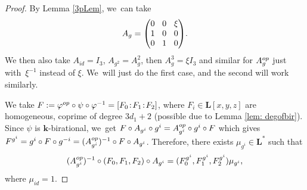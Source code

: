 \documentclass[10pt,a4paper]{amsart}
\newcommand{\op}{\textup{op}}
\newcommand{\sep}{\mkern2mu{:}\mkern2mu}
\theoremstyle{definition}
\newcommand{\kk}{{\boldsymbol{k}}}
\newcommand{\LL}{{\boldsymbol{L}}}
\begin{document}
\begin{proof}
By Lemma \ref{3pLem}, we~can take
\[\arraycolsep4.5pt
A_g =
\begin{pmatrix}
0 & 0 & \xi \\
1 & 0 & 0 \\
0 & 1 & 0
\end{pmatrix}\!.
\]
We then also take $A_{id} = I_3$, $A_{g^2} = A_g^2$, then $A_g^3 = \xi I_3$ and similar for $A_g^{\op}$ just with~$\xi^{-1}$ instead of $\xi$. We~will just do the first case, and the second will work similarly.

We take $F := \varphi^{\op} \circ \psi \circ \varphi^{-1} = [F_0\sep F_1\sep F_2]$, where $F_i \in \LL[x,y,z]$ are homogeneous, coprime of degree $3d_1 + 2$ (possible due to Lemma \ref{lem: degofbir}). Since $\psi$ is $\kk$-birational, we~get $F \circ A_{g^i} \circ g^i = A_{g^i}^{\op} \circ g^i \circ F$ which gives $F^{g^i} = g^{i} \circ F \circ g^{-i} = (A_{g^{i}}^{\op})^{-1} \circ F \circ A_{g^{i}}$. Therefore, there exists $\mu_{g^{i}} \in \LL^*$ such that
\[
(A_{g^{i}}^{\op})^{-1} \circ (F_0, F_1, F_2) \circ A_{g^{i}} = (F_0^{g^{i}},F_1^{g^{i}},F_2^{g^{i}})\mu_{g^{i}},
\]
where $\mu_{id} = 1$.


\end{proof}
\end{document}

